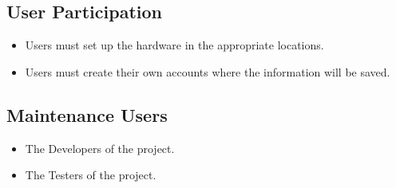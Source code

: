 \subsection{User Participation}
\begin{itemize}
    \item Users must set up the hardware in the appropriate locations.
    \item Users must create their own accounts where the information will be saved.
\end{itemize}
 
\subsection{Maintenance Users}
\begin{itemize}
    \item The Developers of the project.
    \item The Testers of the project.
\end{itemize}



